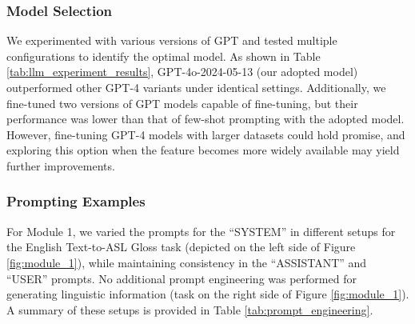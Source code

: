 \subsubsection{Model Selection} We experimented with various versions of GPT and tested multiple configurations to identify the optimal model. As shown in Table \ref{tab:llm_experiment_results}, GPT-4o-2024-05-13 (our adopted model) outperformed other GPT-4 variants under identical settings. Additionally, we fine-tuned two versions of GPT models capable of fine-tuning, but their performance was lower than that of few-shot prompting with the adopted model. However, fine-tuning GPT-4 models with larger datasets could hold promise, and exploring this option when the feature becomes more widely available may yield further improvements.

\subsubsection{Prompting Examples} For Module 1, we varied the prompts for the ``SYSTEM'' in different setups for the English Text-to-ASL Gloss task (depicted on the left side of Figure \ref{fig:module_1}), while maintaining consistency in the ``ASSISTANT'' and ``USER'' prompts. No additional prompt engineering was performed for generating linguistic information (task on the right side of Figure \ref{fig:module_1}). A summary of these setups is provided in Table \ref{tab:prompt_engineering}.
